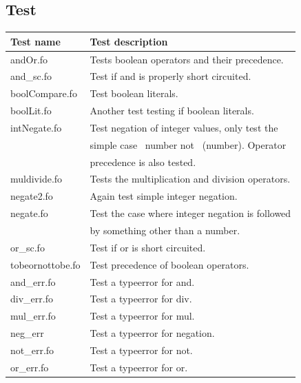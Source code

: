 \documentclass[11pt]{article}
\begin{document}
    \subsection{Test}
    \begin{tabular}{|l|l|}
        \hline
        \textbf{Test name} & \textbf{Test description}                        \\
        \hline
        andOr.fo           & Tests boolean operators and their precedence.    \\
        \hline
        and\_sc.fo         & Test if and is properly short circuited.         \\
        \hline
        boolCompare.fo     & Test boolean literals.                           \\
        \hline
        boolLit.fo         & Another test testing if boolean literals.        \\
        \hline
        intNegate.fo       & Test negation of integer values, only test the   \\
                           & simple case ~number not ~(number).  Operator     \\
                           & precedence is also tested.                       \\
        \hline
        muldivide.fo       & Tests the multiplication and division operators. \\
        \hline
        negate2.fo         & Again test simple integer negation.              \\
        \hline
        negate.fo          & Test the case where integer negation is followed \\
                           & by something other than a number.                \\
        \hline
        or\_sc.fo          & Test if or is short circuited.                   \\
        \hline
        tobeornottobe.fo   & Test precedence of boolean operators.            \\
        \hline
        and\_err.fo        & Test a typeerror for and.                        \\
        \hline
        div\_err.fo        & Test a typeerror for div.                        \\
        \hline
        mul\_err.fo        & Test a typeerror for mul.                        \\
        \hline
        neg\_err           & Test a typeerror for negation.                   \\
        \hline
        not\_err.fo        & Test a typeerror for not.                        \\
        \hline
        or\_err.fo         & Test a typeerror for or.                         \\
        \hline
    \end{tabular}
\end{document}
